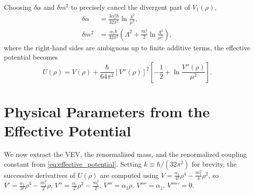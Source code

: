Choosing $\delta\alpha$ and $\delta m^2$ to precisely cancel the divergent
part of $V_1(\rho)$,
\begin{align}
    \delta\alpha &= \frac{3\alpha_1^2\hbar}{32\pi^2}
    \ln\frac{\Lambda^2}{\mu^2}, \\
    \delta m^2 &= \frac{\alpha_1\hbar}{32\pi^2}
    \left(\Lambda^2 + \frac{m_1^2}{2}\ln\frac{\Lambda^2}{\mu^2}\right),
\end{align}
where the right-hand sides are ambiguous up to finite additive terms, the
effective potential becomes
\begin{equation}
    U(\rho) = V(\rho) + \frac{\hbar}{64\pi^2}\left[V''(\rho)\right]^2
    \left[-\frac{1}{2} + \ln\frac{V''(\rho)}{\mu^2}\right].
    \label{eq:effective_potential}
\end{equation}

\section{Physical Parameters from the Effective Potential}

We now extract the VEV, the renormalized mass, and the renormalized
coupling constant from \eqref{eq:effective_potential}. Setting $k \equiv
\hbar/(32\pi^2)$ for brevity, the successive derivatives of $U(\rho)$ are
computed using $V = \frac{\alpha_1}{4!}\rho^4 - \frac{m_1^2}{4}\rho^2$,
so $V' = \frac{\alpha_1}{3!}\rho^3 - \frac{m_1^2}{2}\rho$,
$V'' = \frac{\alpha_1}{2}\rho^2 - \frac{m_1^2}{2}$,
$V''' = \alpha_1\rho$, $V'''' = \alpha_1$, $V''''' = 0$.


